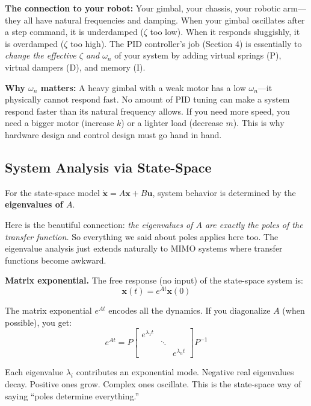 \begin{mdframed}[linewidth=1pt, innertopmargin=10pt, innerbottommargin=10pt]
\textbf{The connection to your robot:} Your gimbal, your chassis, your robotic arm---they all have natural frequencies and damping. When your gimbal oscillates after a step command, it is underdamped ($\zeta$ too low). When it responds sluggishly, it is overdamped ($\zeta$ too high). The PID controller's job (Section 4) is essentially to \textit{change the effective $\zeta$ and $\omega_n$} of your system by adding virtual springs (P), virtual dampers (D), and memory (I).

\textbf{Why $\omega_n$ matters:} A heavy gimbal with a weak motor has a low $\omega_n$---it physically cannot respond fast. No amount of PID tuning can make a system respond faster than its natural frequency allows. If you need more speed, you need a bigger motor (increase $k$) or a lighter load (decrease $m$). This is why hardware design and control design must go hand in hand.
\end{mdframed}

\subsection{System Analysis via State-Space}

For the state-space model $\dot{\mathbf{x}} = A\mathbf{x} + B\mathbf{u}$, system behavior is determined by the \textbf{eigenvalues of $A$}.

Here is the beautiful connection: \textit{the eigenvalues of $A$ are exactly the poles of the transfer function.} So everything we said about poles applies here too. The eigenvalue analysis just extends naturally to MIMO systems where transfer functions become awkward.

\textbf{Matrix exponential.} The free response (no input) of the state-space system is:
\begin{equation}
\mathbf{x}(t) = e^{At}\mathbf{x}(0)
\end{equation}

The matrix exponential $e^{At}$ encodes all the dynamics. If you diagonalize $A$ (when possible), you get:
\begin{equation}
e^{At} = P \begin{bmatrix} e^{\lambda_1 t} & & \\ & \ddots & \\ & & e^{\lambda_n t} \end{bmatrix} P^{-1}
\end{equation}

Each eigenvalue $\lambda_i$ contributes an exponential mode. Negative real eigenvalues decay. Positive ones grow. Complex ones oscillate. This is the state-space way of saying ``poles determine everything.''

